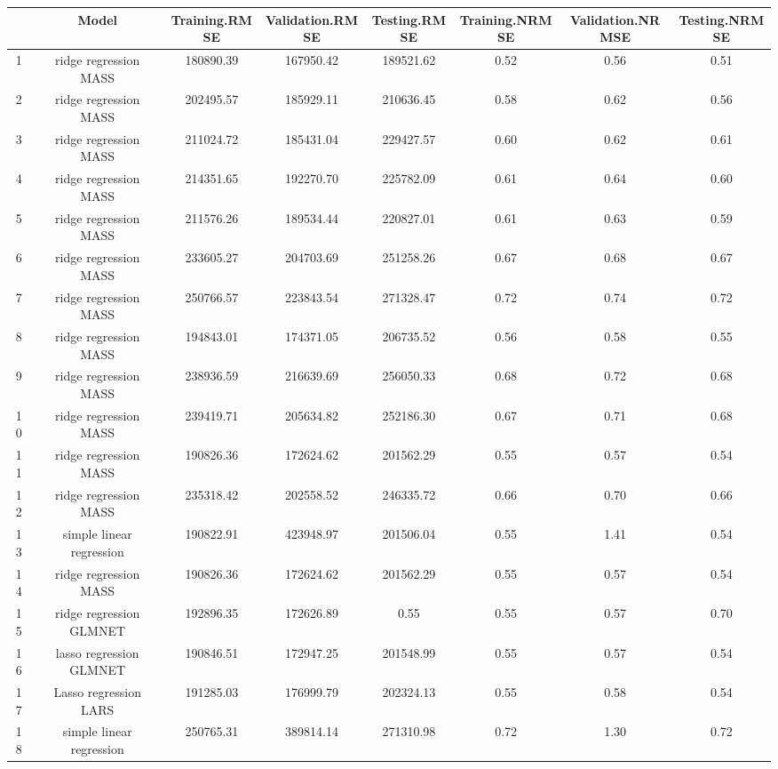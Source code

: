 % 
\begin{tabular}{cccccccc}
  \hline
 & Model & Training.RMSE & Validation.RMSE & Testing.RMSE & Training.NRMSE & Validation.NRMSE & Testing.NRMSE \\ 
  \hline
1 & ridge regression MASS & 180890.39 & 167950.42 & 189521.62 & 0.52 & 0.56 & 0.51 \\ 
  2 & ridge regression MASS & 202495.57 & 185929.11 & 210636.45 & 0.58 & 0.62 & 0.56 \\ 
  3 & ridge regression MASS & 211024.72 & 185431.04 & 229427.57 & 0.60 & 0.62 & 0.61 \\ 
  4 & ridge regression MASS & 214351.65 & 192270.70 & 225782.09 & 0.61 & 0.64 & 0.60 \\ 
  5 & ridge regression MASS & 211576.26 & 189534.44 & 220827.01 & 0.61 & 0.63 & 0.59 \\ 
  6 & ridge regression MASS & 233605.27 & 204703.69 & 251258.26 & 0.67 & 0.68 & 0.67 \\ 
  7 & ridge regression MASS & 250766.57 & 223843.54 & 271328.47 & 0.72 & 0.74 & 0.72 \\ 
  8 & ridge regression MASS & 194843.01 & 174371.05 & 206735.52 & 0.56 & 0.58 & 0.55 \\ 
  9 & ridge regression MASS & 238936.59 & 216639.69 & 256050.33 & 0.68 & 0.72 & 0.68 \\ 
  10 & ridge regression MASS & 239419.71 & 205634.82 & 252186.30 & 0.67 & 0.71 & 0.68 \\ 
  11 & ridge regression MASS & 190826.36 & 172624.62 & 201562.29 & 0.55 & 0.57 & 0.54 \\ 
  12 & ridge regression MASS & 235318.42 & 202558.52 & 246335.72 & 0.66 & 0.70 & 0.66 \\ 
  13 & simple linear regression & 190822.91 & 423948.97 & 201506.04 & 0.55 & 1.41 & 0.54 \\ 
  14 & ridge regression MASS & 190826.36 & 172624.62 & 201562.29 & 0.55 & 0.57 & 0.54 \\ 
  15 & ridge regression GLMNET & 192896.35 & 172626.89 & 0.55 & 0.55 & 0.57 & 0.70 \\ 
  16 & lasso regression GLMNET & 190846.51 & 172947.25 & 201548.99 & 0.55 & 0.57 & 0.54 \\ 
  17 & Lasso regression LARS & 191285.03 & 176999.79 & 202324.13 & 0.55 & 0.58 & 0.54 \\ 
  18 & simple linear regression & 250765.31 & 389814.14 & 271310.98 & 0.72 & 1.30 & 0.72 \\ 

\end{tabular}
